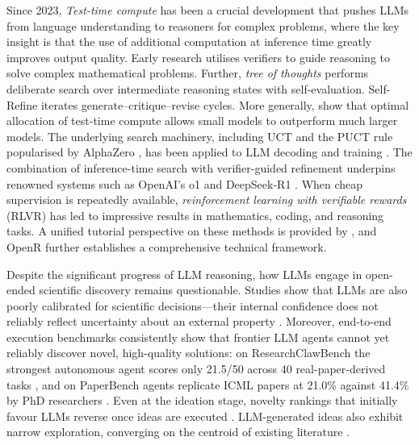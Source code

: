 Since 2023, \emph{Test-time compute} has been a crucial development that pushes LLMs from language understanding to reasoners for complex problems, where the key insight is that the use of additional computation at inference time greatly improves output quality. Early research utilises verifiers \citep{cobbeTrainingVerifiersSolve2021, lightmanLetsVerifyStep2023} to guide reasoning to solve complex mathematical problems. Further, \emph{tree of thoughts} \citep{yao2023tree} performs deliberate search over intermediate reasoning states with self-evaluation. Self-Refine \citep{madaan2023selfrefine} iterates generate--critique--revise cycles. More generally, \citet{snell2025scaling} show that optimal allocation of test-time compute allows small models to outperform much larger models. The underlying search machinery, including UCT \citep{kocsis2006bandit} and the PUCT rule popularised by AlphaZero \citep{silver2017mastering}, has been applied to LLM decoding and training \citep{fengAlphazerolikeTreeSearchCan2024}. The combination of inference-time search with verifier-guided refinement underpins renowned systems such as OpenAI's o1 \citep{openaiOpenAIO1System2024} and DeepSeek-R1 \citep{deepseek-aiDeepSeekR1IncentivizingReasoning2025}. When cheap supervision is repeatedly available, \emph{reinforcement learning with verifiable rewards} (RLVR) \citep{deepseek-aiDeepSeekR1IncentivizingReasoning2025, shaoDeepSeekMathPushingLimits2024} has led to impressive results in mathematics, coding, and reasoning tasks. A unified tutorial perspective on these methods is provided by \citet{wangTutorialLLMReasoning2025}, and OpenR \citep{wang2024openr} further establishes a comprehensive technical framework.

Despite the significant progress of LLM reasoning, how LLMs engage in open-ended scientific discovery remains questionable. Studies show that LLMs are also poorly calibrated for scientific decisions---their internal confidence does not reliably reflect uncertainty about an external property \citep{guptaLLMsBayesianOptimization2025,kristiadiSoberLookLLMs2024}. Moreover, end-to-end execution benchmarks consistently show that frontier LLM agents cannot yet reliably discover novel, high-quality solutions: on ResearchClawBench the strongest autonomous agent scores only 21.5/50 across 40 real-paper-derived tasks \citep{xu2026researchclawbench}, and on PaperBench agents replicate ICML papers at 21.0\% against 41.4\% by PhD researchers \citep{starace2025paperbench}. Even at the ideation stage, novelty rankings that initially favour LLMs \citep{si2024novelideas} reverse once ideas are executed \citep{si2025executiongap}. LLM-generated ideas also exhibit narrow exploration, converging on the centroid of existing literature \citep{tang2026narrowexploration}. 

